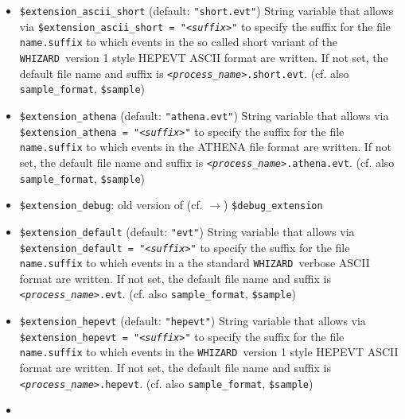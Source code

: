 \documentclass[12pt]{book}
\newcommand{\ttt}[1]{\texttt{#1}}
\newcommand{\whizard}{\texttt{WHIZARD}}
\begin{document}
\begin{itemize}
String variable that allows via \ttt{\$extension\_ascii\_long =
  "{\em <suffix>}"} to specify the suffix for the file \ttt{name.suffix} to
which events in the so called long variant of the \whizard\ version 1 style
HEPEVT ASCII format are written. If not set, the default file name and
suffix is \ttt{{\em <process\_name>}.long.evt}. (cf. also \ttt{sample\_format},
\ttt{\$sample})
\item
\ttt{\$extension\_ascii\_short} \qquad (default: \ttt{"short.evt"}) \newline
String variable that allows via \ttt{\$extension\_ascii\_short =
  "{\em <suffix>}"} to specify the suffix for the file \ttt{name.suffix} to
which events in the so called short variant of the \whizard\ version 1
style HEPEVT ASCII format are written. If not set, the default file
name and suffix is \ttt{{\em <process\_name>}.short.evt}. (cf. also
\ttt{sample\_format}, \ttt{\$sample})
\item
\ttt{\$extension\_athena} \qquad (default: \ttt{"athena.evt"}) \newline
String variable that allows via \ttt{\$extension\_athena =
  "{\em <suffix>}"} to specify the suffix for the file \ttt{name.suffix} to
which events in the ATHENA file format are written. If not set, the
default file name and suffix is
\ttt{{\em <process\_name>}.athena.evt}. (cf. also \ttt{sample\_format},
\ttt{\$sample}) 
\item
\ttt{\$extension\_debug}: old version of (cf. $\to$)
\ttt{\$debug\_extension}
\item
\ttt{\$extension\_default} \qquad (default: \ttt{"evt"}) \newline
String variable that allows via \ttt{\$extension\_default = "{\em <suffix>}"} to 
specify the suffix for the file \ttt{name.suffix} to which events in a
the standard \whizard\ verbose ASCII format are written. If not
set, the default file name and suffix is \ttt{{\em <process\_name>}.evt}. (cf. also
\ttt{sample\_format}, \ttt{\$sample}) 
\item
\ttt{\$extension\_hepevt} \qquad (default: \ttt{"hepevt"}) \newline
String variable that allows via \ttt{\$extension\_hepevt = "{\em <suffix>}"} to 
specify the suffix for the file \ttt{name.suffix} to which events in
the \whizard\ version 1 style HEPEVT ASCII format are written. If not set, the
default file name and suffix is
\ttt{{\em <process\_name>}.hepevt}. (cf. also \ttt{sample\_format},
\ttt{\$sample})
\item

\end{itemize}
\end{document}

